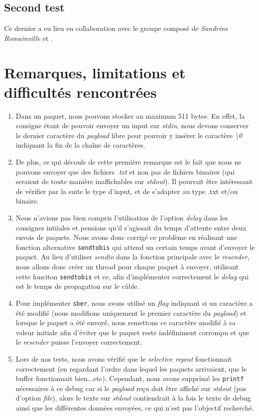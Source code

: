 \documentclass[11pt]{article}
\begin{document}
\subsection{Second test}
Ce dernier a eu lieu en collaboration avec le groupe composé de \textit{Sandrine Romainville} et \textit{   }.

\section{Remarques, limitations et difficultés rencontrées}
\begin{enumerate}
\item Dans un paquet, nous pouvons stocker au maximum 511 bytes. En effet, la consigne étant de pouvoir envoyer un input sur \textit{stdin}, nous devons conserver le dernier caractère du \textit{payload} libre pour pouvoir y insérer le caractère \textit{\textbackslash 0} indiquant la fin de la chaîne de caractères. 
\smallskip
\item De plus, ce qui découle de cette première remarque est le fait que nous ne pouvons envoyer que des fichiers \textit{.txt} et non pas de fichiers binaires (qui seraient de toute manière inaffichables sur \textit{stdout}). Il pourrait être intéressant de vérifier par la suite le type d'input, et de s'adapter au type .txt et/ou binaire.
\smallskip
\item Nous n'avions pas bien compris l'utilisation de l'option \textit{delay} dans les consignes intiiales et pensions qu'il s'agissait du temps d'attente entre deux envois de paquets. Nous avons donc corrigé ce problème en réalisant une fonction alternative \texttt{sendtobis} qui attend un certain temps avant d'envoyer le paquet. Au lieu d'utiliser \textit{sendto} dans la fonction principale avec le \textit{resender}, nous allons donc créer un thread pour chaque paquet à envoyer, utilisant cette fonciton \texttt{sendtobis} et ce, afin d'implémenter correctement le \textit{delay} qui est le temps de propagation sur le câble. 
\smallskip
\item Pour implémenter \texttt{sber}, nous avons utilisé un \textit{flag} indiquant si un caractère a été modifié (nous modifions uniquement le premier caractère du \textit{payload}) et lorsque le paquet a été envoyé, nous remettons ce caractère modifié à sa valeur initiale afin d'éviter que le paquet reste indéfiniment corrompu et que le \textit{resender} puisse l'envoyer correctement.
\smallskip
\item Lors de nos tests, nous avons vérifié que le \textit{selective repeat} fonctionnait correctement (en regardant l'ordre dans lequel les paquets arrivaient, que le buffer fonctionnait bien...etc). Cependant, nous avons supprimé les \texttt{printf} nécessaires à ce debug car si le \textit{payload} reçu doit être affiché sur \textit{stdout} (pas d'option \textit{file}), alors le texte sur \textit{stdout} contiendrait à la fois le texte de debug ainsi que les différentes données envoyées, ce qui n'est pas l'objectif recherché. 

\end{enumerate}
\end{document}

